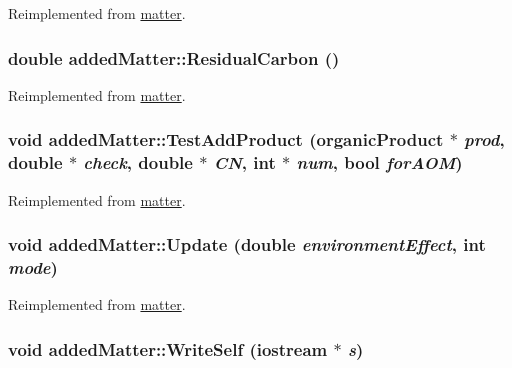 Reimplemented from \hyperlink{classmatter_a9fe8f4ee934f280c9964dacc27d42611}{matter}.\hypertarget{classadded_matter_a17298527be7046b6035a163e1f558f84}{
\subsubsection[{ResidualCarbon}]{\setlength{\rightskip}{0pt plus 5cm}double addedMatter::ResidualCarbon ()}}
\label{classadded_matter_a17298527be7046b6035a163e1f558f84}


Reimplemented from \hyperlink{classmatter_abaf880e3b1efd04eae0db055caed9b12}{matter}.\hypertarget{classadded_matter_a3627f9e81c355df213e783f1ba4a53b2}{
\subsubsection[{TestAddProduct}]{\setlength{\rightskip}{0pt plus 5cm}void addedMatter::TestAddProduct ({\bf organicProduct} $\ast$ {\em prod}, \/  double $\ast$ {\em check}, \/  double $\ast$ {\em CN}, \/  int $\ast$ {\em num}, \/  bool {\em forAOM})}}
\label{classadded_matter_a3627f9e81c355df213e783f1ba4a53b2}


Reimplemented from \hyperlink{classmatter_ac17664d421545b45ef91061b17ae6c7b}{matter}.\hypertarget{classadded_matter_af259408e737a8605b710842d67f72ad7}{
\subsubsection[{Update}]{\setlength{\rightskip}{0pt plus 5cm}void addedMatter::Update (double {\em environmentEffect}, \/  int {\em mode})}}
\label{classadded_matter_af259408e737a8605b710842d67f72ad7}


Reimplemented from \hyperlink{classmatter_a2b3dd492a18a139790bd227e2b4e0a70}{matter}.\hypertarget{classadded_matter_a288683b6f62f782a4cd1706d48dc1c0e}{
\subsubsection[{WriteSelf}]{\setlength{\rightskip}{0pt plus 5cm}void addedMatter::WriteSelf (iostream $\ast$ {\em s})}}
\label{classadded_matter_a288683b6f62f782a4cd1706d48dc1c0e}


